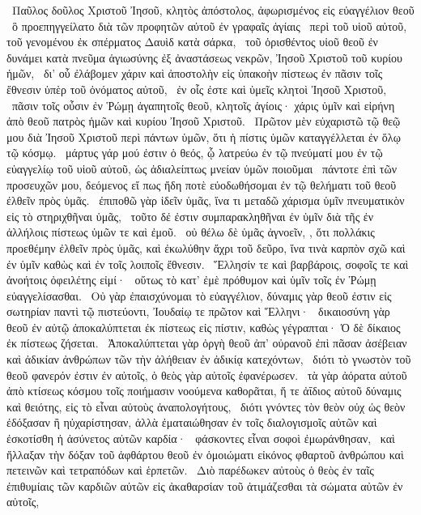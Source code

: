 
~Παῦλος δοῦλος Χριστοῦ Ἰησοῦ, κλητὸς ἀπόστολος, ἀφωρισμένος εἰς εὐαγγέλιον θεοῦ
~ὃ προεπηγγείλατο διὰ τῶν προφητῶν αὐτοῦ ἐν γραφαῖς ἁγίαις
~περὶ τοῦ υἱοῦ αὐτοῦ, τοῦ γενομένου ἐκ σπέρματος Δαυὶδ κατὰ σάρκα,
~τοῦ ὁρισθέντος υἱοῦ θεοῦ ἐν δυνάμει κατὰ πνεῦμα ἁγιωσύνης ἐξ ἀναστάσεως νεκρῶν, Ἰησοῦ Χριστοῦ τοῦ κυρίου ἡμῶν,
~δι’ οὗ ἐλάβομεν χάριν καὶ ἀποστολὴν εἰς ὑπακοὴν πίστεως ἐν πᾶσιν τοῖς ἔθνεσιν ὑπὲρ τοῦ ὀνόματος αὐτοῦ,
~ἐν οἷς ἐστε καὶ ὑμεῖς κλητοὶ Ἰησοῦ Χριστοῦ,
~πᾶσιν τοῖς οὖσιν ἐν Ῥώμῃ ἀγαπητοῖς θεοῦ, κλητοῖς ἁγίοις· χάρις ὑμῖν καὶ εἰρήνη ἀπὸ θεοῦ πατρὸς ἡμῶν καὶ κυρίου Ἰησοῦ Χριστοῦ.
~Πρῶτον μὲν εὐχαριστῶ τῷ θεῷ μου διὰ Ἰησοῦ Χριστοῦ περὶ πάντων ὑμῶν, ὅτι ἡ πίστις ὑμῶν καταγγέλλεται ἐν ὅλῳ τῷ κόσμῳ.
~μάρτυς γάρ μού ἐστιν ὁ θεός, ᾧ λατρεύω ἐν τῷ πνεύματί μου ἐν τῷ εὐαγγελίῳ τοῦ υἱοῦ αὐτοῦ, ὡς ἀδιαλείπτως μνείαν ὑμῶν ποιοῦμαι
~πάντοτε ἐπὶ τῶν προσευχῶν μου, δεόμενος εἴ πως ἤδη ποτὲ εὐοδωθήσομαι ἐν τῷ θελήματι τοῦ θεοῦ ἐλθεῖν πρὸς ὑμᾶς.
~ἐπιποθῶ γὰρ ἰδεῖν ὑμᾶς, ἵνα τι μεταδῶ χάρισμα ὑμῖν πνευματικὸν εἰς τὸ στηριχθῆναι ὑμᾶς,
~τοῦτο δέ ἐστιν συμπαρακληθῆναι ἐν ὑμῖν διὰ τῆς ἐν ἀλλήλοις πίστεως ὑμῶν τε καὶ ἐμοῦ.
~οὐ θέλω δὲ ὑμᾶς ἀγνοεῖν, , ὅτι πολλάκις προεθέμην ἐλθεῖν πρὸς ὑμᾶς, καὶ ἐκωλύθην ἄχρι τοῦ δεῦρο, ἵνα τινὰ καρπὸν σχῶ καὶ ἐν ὑμῖν καθὼς καὶ ἐν τοῖς λοιποῖς ἔθνεσιν.
~Ἕλλησίν τε καὶ βαρβάροις, σοφοῖς τε καὶ ἀνοήτοις ὀφειλέτης εἰμί·
~οὕτως τὸ κατ’ ἐμὲ πρόθυμον καὶ ὑμῖν τοῖς ἐν Ῥώμῃ εὐαγγελίσασθαι.
~Οὐ γὰρ ἐπαισχύνομαι τὸ εὐαγγέλιον, δύναμις γὰρ θεοῦ ἐστιν εἰς σωτηρίαν παντὶ τῷ πιστεύοντι, Ἰουδαίῳ τε πρῶτον καὶ Ἕλληνι·
~δικαιοσύνη γὰρ θεοῦ ἐν αὐτῷ ἀποκαλύπτεται ἐκ πίστεως εἰς πίστιν, καθὼς γέγραπται· Ὁ δὲ δίκαιος ἐκ πίστεως ζήσεται.
~Ἀποκαλύπτεται γὰρ ὀργὴ θεοῦ ἀπ’ οὐρανοῦ ἐπὶ πᾶσαν ἀσέβειαν καὶ ἀδικίαν ἀνθρώπων τῶν τὴν ἀλήθειαν ἐν ἀδικίᾳ κατεχόντων,
~διότι τὸ γνωστὸν τοῦ θεοῦ φανερόν ἐστιν ἐν αὐτοῖς, ὁ θεὸς γὰρ αὐτοῖς ἐφανέρωσεν.
~τὰ γὰρ ἀόρατα αὐτοῦ ἀπὸ κτίσεως κόσμου τοῖς ποιήμασιν νοούμενα καθορᾶται, ἥ τε ἀΐδιος αὐτοῦ δύναμις καὶ θειότης, εἰς τὸ εἶναι αὐτοὺς ἀναπολογήτους,
~διότι γνόντες τὸν θεὸν οὐχ ὡς θεὸν ἐδόξασαν ἢ ηὐχαρίστησαν, ἀλλὰ ἐματαιώθησαν ἐν τοῖς διαλογισμοῖς αὐτῶν καὶ ἐσκοτίσθη ἡ ἀσύνετος αὐτῶν καρδία·
~φάσκοντες εἶναι σοφοὶ ἐμωράνθησαν,
~καὶ ἤλλαξαν τὴν δόξαν τοῦ ἀφθάρτου θεοῦ ἐν ὁμοιώματι εἰκόνος φθαρτοῦ ἀνθρώπου καὶ πετεινῶν καὶ τετραπόδων καὶ ἑρπετῶν.
~Διὸ παρέδωκεν αὐτοὺς ὁ θεὸς ἐν ταῖς ἐπιθυμίαις τῶν καρδιῶν αὐτῶν εἰς ἀκαθαρσίαν τοῦ ἀτιμάζεσθαι τὰ σώματα αὐτῶν ἐν αὐτοῖς,
